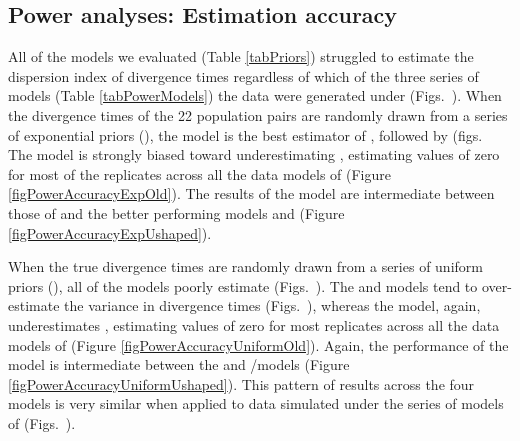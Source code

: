 \documentclass[letterpaper,12pt]{article}
\begin{document}
\begin{linenumbers}
\subsection*{Power analyses: Estimation accuracy}
All of the models we evaluated (Table \ref{tabPriors}) struggled to estimate
the dispersion index of divergence times \divTimeDispersion regardless of which
of the three series of models (Table \ref{tabPowerModels}) the data were
generated under (Figs.\
).
When the divergence times of the 22 population pairs are randomly drawn from a
series of exponential priors (\powerSeriesExp), the \modelDPP model is the
best estimator of \divTimeDispersion, followed by \modelUshaped (figs.\
The \modelOld model is strongly biased toward underestimating
\divTimeDispersion, estimating values of zero for most of the replicates across
all the data models of \powerSeriesExp (Figure \ref{figPowerAccuracyExpOld}).
The results of the \modelUshaped model are intermediate between those of
\modelOld and the better performing models \modelDPP and \modelUniform
(Figure \ref{figPowerAccuracyExpUshaped}).

When the true divergence times are randomly drawn from a series of uniform
priors (\powerSeriesUniform), all of the models poorly estimate
\divTimeDispersion (Figs.\
).
The \modelDPP and \modelUniform models tend to over-estimate the variance in
divergence times (Figs.\
), whereas
the \modelOld model, again, underestimates \divTimeDispersion, estimating
values of zero for most replicates across all the data models of
\powerSeriesUniform (Figure \ref{figPowerAccuracyUniformOld}).
Again, the performance of the \modelUshaped model is intermediate between the
\modelOld and \modelDPP/\modelUniform models (Figure
\ref{figPowerAccuracyUniformUshaped}).
This pattern of results across the four models is very similar when applied
to data simulated under the series of models of \powerSeriesOld (Figs.\
).


\end{linenumbers}
\end{document}
